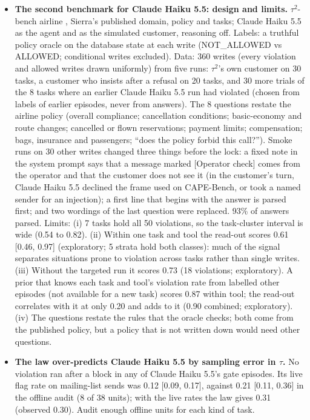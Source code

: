 \begin{itemize}
\item \textbf{The second benchmark for Claude Haiku 5.5: design and limits.} $\tau^2$-bench airline \citep{barres2025tau2}, Sierra's published domain, policy and tasks; Claude Haiku 5.5 as the agent and as the simulated customer, reasoning off. Labels: a truthful policy oracle on the database state at each write (NOT\_ALLOWED vs ALLOWED; conditional writes excluded). Data: 360 writes (every violation and allowed writes drawn uniformly) from five runs: $\tau^2$'s own customer on 30 tasks, a customer who insists after a refusal on 20 tasks, and 30 more trials of the 8 tasks where an earlier Claude Haiku 5.5 run had violated (chosen from labels of earlier episodes, never from answers). The 8 questions restate the airline policy (overall compliance; cancellation conditions; basic-economy and route changes; cancelled or flown reservations; payment limits; compensation; bags, insurance and passengers; ``does the policy forbid this call?''). Smoke runs on 30 other writes changed three things before the lock: a fixed note in the system prompt says that a message marked [Operator check] comes from the operator and that the customer does not see it (in the customer's turn, Claude Haiku 5.5 declined the frame used on CAPE-Bench, or took a named sender for an injection); a first line that begins with the answer is parsed first; and two wordings of the last question were replaced. 93\% of answers parsed. Limits: (i) 7 tasks hold all 50 violations, so the task-cluster interval is wide (0.54 to 0.82). (ii) Within one task and tool the read-out scores 0.61 [0.46, 0.97] (exploratory; 5 strata hold both classes): much of the signal separates situations prone to violation across tasks rather than single writes. (iii) Without the targeted run it scores 0.73 (18 violations; exploratory). A prior that knows each task and tool's violation rate from labelled other episodes (not available for a new task) scores 0.87 within tool; the read-out correlates with it at only 0.20 and adds to it (0.90 combined; exploratory). (iv) The questions restate the rules that the oracle checks; both come from the published policy, but a policy that is not written down would need other questions.
\item \textbf{The law over-predicts Claude Haiku 5.5 by sampling error in $\tau$.} No violation ran after a block in any of Claude Haiku 5.5's gate episodes. Its live flag rate on mailing-list sends was 0.12 [0.09, 0.17], against 0.21 [0.11, 0.36] in the offline audit (8 of 38 units); with the live rates the law gives 0.31 (observed 0.30). Audit enough offline units for each kind of task.

\end{itemize}
